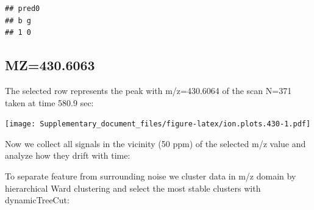 \documentclass[]{article}
\newenvironment{Shaded}{\begin{snugshade}}{\end{snugshade}}
\newcommand{\KeywordTok}[1]{\textcolor[rgb]{0.13,0.29,0.53}{\textbf{#1}}}
\newcommand{\FloatTok}[1]{\textcolor[rgb]{0.00,0.00,0.81}{#1}}
\newcommand{\StringTok}[1]{\textcolor[rgb]{0.31,0.60,0.02}{#1}}
\newcommand{\OperatorTok}[1]{\textcolor[rgb]{0.81,0.36,0.00}{\textbf{#1}}}
\newcommand{\NormalTok}[1]{#1}
\begin{document}
\begin{verbatim}
## pred0
## b g 
## 1 0
\end{verbatim}

\subsection{MZ=430.6063}\label{mz430.6063}

\begin{Shaded}
\end{Shaded}

The selected row represents the peak with m/z=430.6064 of the scan N=371
taken at time 580.9 sec:

\begin{Shaded}
\end{Shaded}

\texttt{[image: Supplementary\_document\_files/figure-latex/ion.plots.430-1.pdf]}

Now we collect all signals in the vicinity (50 ppm) of the selected m/z
value and analyze how they drift with time:

\begin{Shaded}
\end{Shaded}

To separate feature from surrounding noise we cluster data in m/z domain
by hierarchical Ward clustering and select the most stable clusters with
dynamicTreeCut:
\end{document}
